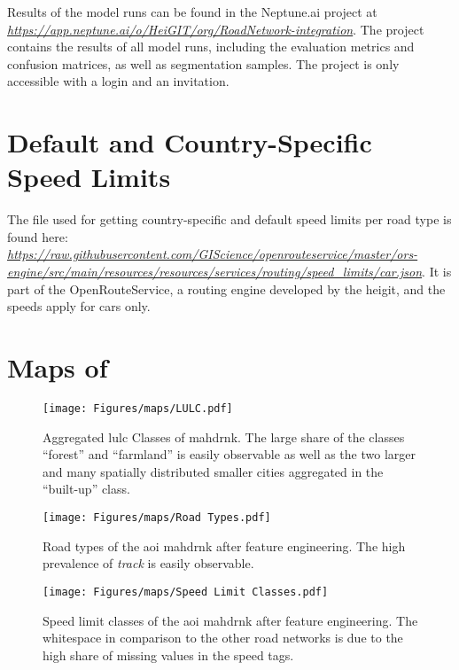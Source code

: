 Results of the model runs can be found in the Neptune.ai project at \emph{\url{https://app.neptune.ai/o/HeiGIT/org/RoadNetwork-integration}}. The project contains the results of all model runs, including the evaluation metrics and confusion matrices, as well as segmentation samples. The project is only accessible with a login and an invitation.

\section{Default and Country-Specific Speed Limits}
\label{app:speeddict}

The file used for getting country-specific and default speed limits per road type is found here: \emph{\url{https://raw.githubusercontent.com/GIScience/openrouteservice/master/ors-engine/src/main/resources/resources/services/routing/speed_limits/car.json}}. It is part of the OpenRouteService, a routing engine developed by the \gls{heigit}, and the speeds apply for cars only.

\clearpage

\section{Maps of }
\label{app:aoi}

\begin{figure}[htb]
    \centering
    \texttt{[image: Figures/maps/LULC.pdf]}
    \caption[ Classes of ]{Aggregated \gls{lulc} Classes of \gls{mahdrnk}. The large share of the classes \enquote{forest} and \enquote{farmland} is easily observable as well as the two larger and many spatially distributed smaller cities aggregated in the \enquote{built-up} class.}
    \label{app_fig:lulc}
\end{figure}

\clearpage

\begin{figure}[htb]
    \centering
    \texttt{[image: Figures/maps/Road Types.pdf]}
    \caption[Feature Engineered Road Types of ]{Road types of the \gls{aoi} \gls{mahdrnk} after feature engineering. The high prevalence of \emph{track} is easily observable.}
    \label{app_fig:roadtypes}
\end{figure}

\clearpage

\begin{figure}[htb]
    \centering
    \texttt{[image: Figures/maps/Speed Limit Classes.pdf]}
    \caption[Feature Engineered Speed Limit Classes of ]{Speed limit classes of the \gls{aoi} \gls{mahdrnk} after feature engineering. The whitespace in comparison to the other road networks is due to the high share of missing values in the speed tags.}
    \label{app_fig:speedlimits}
\end{figure}


